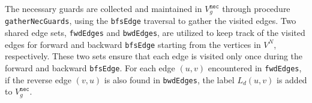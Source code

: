 
The necessary guards are collected and maintained in $V_{g}^{\texttt{nec}}$ through procedure \texttt{gatherNecGuards}, using the \texttt{bfsEdge} traversal to gather the visited edges. 
Two shared edge sets, \texttt{fwdEdges} and \texttt{bwdEdges}, are utilized to keep track of the visited edges for forward and backward \texttt{bfsEdge} starting from the vertices in $V^{N}$, respectively. 
These two sets ensure that each edge is visited only once during the forward and backward \texttt{bfsEdge}.
For each edge $(u, v)$ encountered in \texttt{fwdEdges}, if the reverse edge $(v, u)$ is also found in \texttt{bwdEdges}, the label $L_d(u, v)$ is added to $V_{g}^{\texttt{nec}}$.



